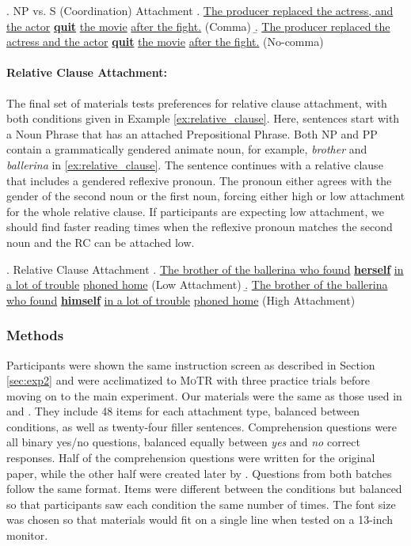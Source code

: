\documentclass[12pt]{article}
\newcommand{\motr}{\textsc{MoTR}\xspace}
\newcommand{\word}[1]{\textit{#1}}
\begin{document}
{\ex. NP vs. S (Coordination) Attachment \label{ex:coordination}
\a.  \ul{The producer replaced the actress, and the actor} \ul{\textbf{quit}} \ul{the movie} \ul{after the fight.} ({\sc Comma})
\b. \ul{The producer replaced the actress and the actor} \ul{\textbf{quit}} \ul{the movie} \ul{after the fight.} ({\sc No-comma})

\paragraph{Relative Clause Attachment:} The final set of materials tests preferences for relative clause attachment, with both conditions given in Example \ref{ex:relative_clause}. Here, sentences start with a Noun Phrase that has an attached Prepositional Phrase. Both NP and PP contain a grammatically gendered animate noun, for example, \word{brother} and \word{ballerina} in \ref{ex:relative_clause}. The sentence continues with a relative clause that includes a gendered reflexive pronoun. The pronoun either agrees with the gender of the second noun or the first noun, forcing either high or low attachment for the whole relative clause. If participants are expecting low attachment, we should find faster reading times when the reflexive pronoun matches the second noun and the RC can be attached low.

\ex. Relative Clause Attachment \label{ex:relative_clause}
\a. \ul{The brother of the ballerina who found} \ul{\textbf{herself}} \ul{in a lot of trouble} \ul{phoned home} ({\sc Low Attachment})
\b. \ul{The brother of the ballerina who found} \ul{\textbf{himself}} \ul{in a lot of trouble} \ul{phoned home} {\sc (High Attachment)}


\subsubsection{Methods}

Participants were shown the same instruction screen as described in Section \ref{sec:exp2} and were acclimatized to \motr with three practice trials before moving on to the main experiment. Our materials were the same as those used in \cite{witzel2012maze} and \cite{boyce2020amaze}. They include 48 items for each attachment type, balanced between conditions, as well as twenty-four filler sentences. Comprehension questions were all binary yes/no questions, balanced equally between \word{yes} and \word{no} correct responses. Half of the comprehension questions were written for the original \cite{witzel2012maze} paper, while the other half were created later by \cite{boyce2020amaze}. Questions from both batches follow the same format. 
Items were different between the conditions but balanced so that participants saw each condition the same number of times. The font size was chosen so that materials would fit on a single line when tested on a 13-inch monitor.

}
\end{document}
